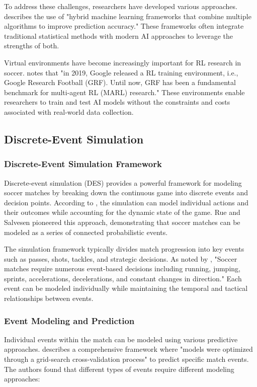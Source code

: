 \documentclass[10pt,journal,compsoc]{IEEEtran}
\begin{document}
To address these challenges, researchers have developed various approaches. \cite{wong2025predictive} describes the use of "hybrid machine learning frameworks that combine multiple algorithms to improve prediction accuracy." These frameworks often integrate traditional statistical methods with modern AI approaches to leverage the strengths of both.

Virtual environments have become increasingly important for RL research in soccer. \cite{pu2024orientation} notes that "in 2019, Google released a RL training environment, i.e., Google Research Football (GRF). Until now, GRF has been a fundamental benchmark for multi-agent RL (MARL) research." These environments enable researchers to train and test AI models without the constraints and costs associated with real-world data collection.

\subsection{Discrete-Event Simulation}

\subsubsection{Discrete-Event Simulation Framework}
Discrete-event simulation (DES) provides a powerful framework for modeling soccer matches by breaking down the continuous game into discrete events and decision points. According to \cite{wong2025predictive}, the simulation can model individual actions and their outcomes while accounting for the dynamic state of the game. Rue and Salvesen \cite{rue2000prediction} pioneered this approach, demonstrating that soccer matches can be modeled as a series of connected probabilistic events.

The simulation framework typically divides match progression into key events such as passes, shots, tackles, and strategic decisions. As noted by \cite{pu2024orientation}, "Soccer matches require numerous event-based decisions including running, jumping, sprints, accelerations, decelerations, and constant changes in direction." Each event can be modeled individually while maintaining the temporal and tactical relationships between events.

\subsubsection{Event Modeling and Prediction}
Individual events within the match can be modeled using various predictive approaches. \cite{wong2025predictive} describes a comprehensive framework where "models were optimized through a grid-search cross-validation process" to predict specific match events. The authors found that different types of events require different modeling approaches:
\end{document}
